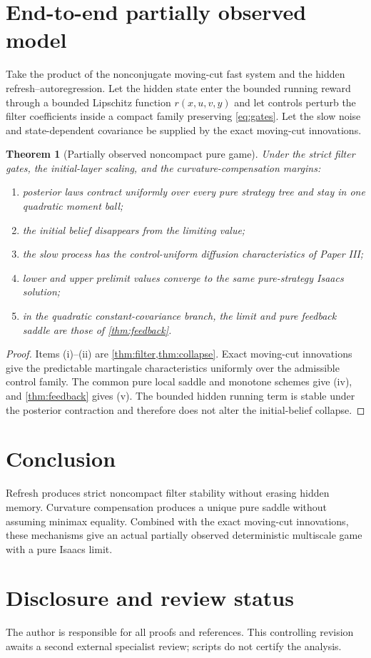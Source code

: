 \documentclass[11pt,reqno]{amsart}
\newtheorem{theorem}{Theorem}[section]
\theoremstyle{definition}
\theoremstyle{remark}
\begin{document}
\section{End-to-end partially observed model}\label{sec:endtoend}
Take the product of the nonconjugate moving-cut fast system and the hidden
refresh--autoregression.  Let the hidden state enter the bounded running reward
through a bounded Lipschitz function $r(x,u,v,y)$ and let controls perturb the
filter coefficients inside a compact family preserving \eqref{eq:gates}.
Let the slow noise and state-dependent covariance be supplied by the exact
moving-cut innovations.

\begin{theorem}[Partially observed noncompact pure game]\label{thm:endtoend}
Under the strict filter gates, the initial-layer scaling, and the
curvature-compensation margins:
\begin{enumerate}[label=(\roman*)]
\item posterior laws contract uniformly over every pure strategy tree and stay
in one quadratic moment ball;
\item the initial belief disappears from the limiting value;
\item the slow process has the control-uniform diffusion characteristics of
Paper III;
\item lower and upper prelimit values converge to the same pure-strategy
Isaacs solution;
\item in the quadratic constant-covariance branch, the limit and pure feedback
saddle are those of \cref{thm:feedback}.
\end{enumerate}
\end{theorem}

\begin{proof}
Items (i)--(ii) are \cref{thm:filter,thm:collapse}.  Exact moving-cut
innovations give the predictable martingale characteristics uniformly over the
admissible control family.  The common pure local saddle and monotone schemes
give (iv), and \cref{thm:feedback} gives (v).  The bounded hidden running term
is stable under the posterior contraction and therefore does not alter the
initial-belief collapse.
\end{proof}

\section{Conclusion}
Refresh produces strict noncompact filter stability without erasing hidden
memory.  Curvature compensation produces a unique pure saddle without
assuming minimax equality.  Combined with the exact moving-cut innovations,
these mechanisms give an actual partially observed deterministic multiscale
game with a pure Isaacs limit.

\section*{Disclosure and review status}
The author is responsible for all proofs and references.  This controlling
revision awaits a second external specialist review; scripts do not certify
the analysis.



\end{document}
